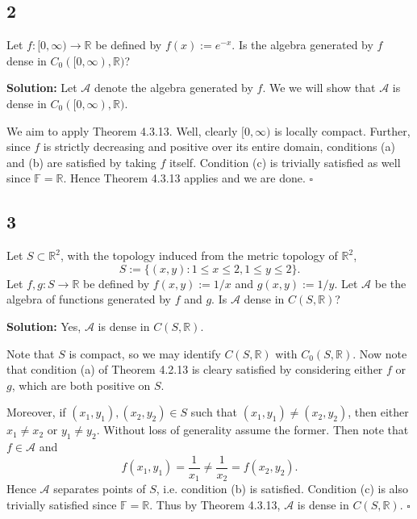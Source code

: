 \documentclass[12pt]{article}
\newcounter{ProofCounter}
\newenvironment{Solution}{\stepcounter{ProofCounter}\textbf{Solution:}}{\hfill$\square$}
\begin{document}
\subsection*{2}
\begin{tcolorbox}
  Let $f : [0, \infty) \rightarrow \mathbb{R}$ be defined by $f(x) := e^{-x}$. Is the algebra generated by $f$ dense in $C_0([0,\infty), \mathbb{R})$?
\end{tcolorbox}
\begin{Solution}
  Let $\mathcal{A}$ denote the algebra generated by $f$. We we will show that $\mathcal{A}$ is dense in $C_0([0,\infty), \mathbb{R})$.

  We aim to apply Theorem 4.3.13. Well, clearly $[0, \infty)$ is locally compact. Further, since $f$ is strictly
  decreasing and positive over its entire domain, conditions (a) and (b) are satisfied by taking $f$ itself. Condition (c) is trivially satisfied as well since
  $\mathbb{F} = \mathbb{R}$. Hence Theorem 4.3.13 applies and we are done.
\end{Solution}


\newpage
\subsection*{3}
\begin{tcolorbox}
  Let $S \subset \mathbb{R}^2$, with the topology induced from the metric topology of $\mathbb{R}^2$,
  \[
    S := \{(x,y) : 1 \leq x \leq 2, 1 \leq y \leq 2\}.
  \]
  Let $f, g : S \rightarrow \mathbb{R}$ be defined by $f(x,y) := 1 / x$ and $g(x,y) := 1 / y$. Let $\mathcal{A}$ be the algebra of functions generated
  by $f$ and $g$. Is $\mathcal{A}$ dense in $C(S, \mathbb{R})$?
\end{tcolorbox}
\begin{Solution}
  Yes, $\mathcal{A}$ is dense in $C(S, \mathbb{R})$.

  Note that $S$ is compact, so we may identify $C(S, \mathbb{R})$ with $C_0(S, \mathbb{R})$. Now note that condition (a) of Theorem 4.2.13 is cleary
  satisfied by considering either $f$ or $g$, which are both positive on $S$. 
  
  Moreover, if $(x_1,y_1), (x_2, y_2) \in S$ such that $(x_1, y_1) \neq
  (x_2, y_2)$, then either $x_1 \neq x_2$ or $y_1 \neq y_2$. Without loss of generality assume the former. Then note that $f \in \mathcal{A}$ and
  \[
    f(x_1, y_1) = \frac{1}{x_1} \neq \frac{1}{x_2} = f(x_2, y_2). 
  \]
  Hence $\mathcal{A}$ separates points of $S$, i.e. condition (b) is satisfied. Condition (c) is
  also trivially satisfied since $\mathbb{F} = \mathbb{R}$. Thus by Theorem 4.3.13, $\mathcal{A}$ is dense in $C(S, \mathbb{R})$.
\end{Solution}
\end{document}
